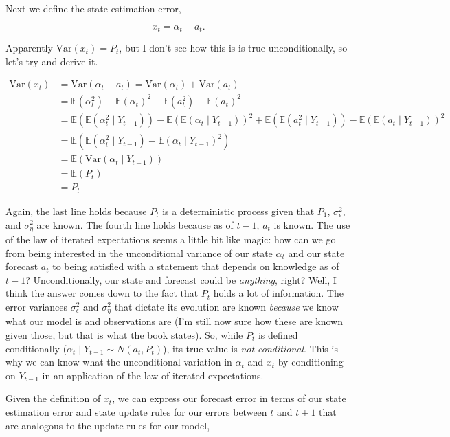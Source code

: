 \documentclass{tufte-book}
\begin{document}
Next we define the state estimation error,

\[
x_t = \alpha_t - a_t.
\]

Apparently $\text{Var}(x_t) = P_t$, but I don't see how this is is true unconditionally, so let's try and derive it.

\begin{align*}
\text{Var}(x_t) &= \text{Var}(\alpha_t - a_t) = \text{Var}(\alpha_t) + \text{Var}(a_t) \\
&= \mathbb{E}(\alpha_t^2) - \mathbb{E}(\alpha_t)^2 + \mathbb{E}(a_t^2) - \mathbb{E}(a_t)^2 \\
&= \mathbb{E}(\mathbb{E}(\alpha_t^2 \mid Y_{t-1})) - \mathbb{E}(\mathbb{E}(\alpha_t \mid Y_{t-1}))^2 + \mathbb{E}(\mathbb{E}(a_t^2 \mid Y_{t-1})) - \mathbb{E}(\mathbb{E}(a_t \mid Y_{t-1}))^2 \\
&= \mathbb{E}(\mathbb{E}(\alpha_t^2 \mid Y_{t-1}) - \mathbb{E}(\alpha_t \mid Y_{t-1})^2) \\
&= \mathbb{E}(\text{Var}(\alpha_t \mid Y_{t-1})) \\
&= \mathbb{E}(P_t) \\
&= P_t
\end{align*}

\noindent Again, the last line holds because $P_t$ is a deterministic process given that $P_1$, $\sigma_\epsilon^2$, and $\sigma_\eta^2$ are known. The fourth line holds because as of $t-1$, $a_t$ is known. The use of the law of iterated expectations seems a little bit like magic: how can we go from being interested in the unconditional variance of our state $\alpha_t$ and our state forecast $a_t$ to being satisfied with a statement that depends on knowledge as of $t-1$? Unconditionally, our state and forecast could be \textit{anything}, right? Well, I think the answer comes down to the fact that $P_t$ holds a lot of information. The error variances $\sigma_\epsilon^2$ and $\sigma_\eta^2$ that dictate its evolution are known \textit{because} we know what our model is and observations are (I'm still now sure how these are known given those, but that is what the book states). So, while $P_t$ is defined conditionally ($\alpha_t \mid Y_{t-1} \sim N(a_t, P_t)$), its true value is \textit{not conditional}. This is why we can know what the unconditional variation in $\alpha_t$ and $x_t$ by conditioning on $Y_{t-1}$ in an application of the law of iterated expectations.

Given the definition of $x_t$, we can express our forecast error in terms of our state estimation error and state update rules for our errors between $t$ and $t+1$ that are analogous to the update rules for our model,
\end{document}

